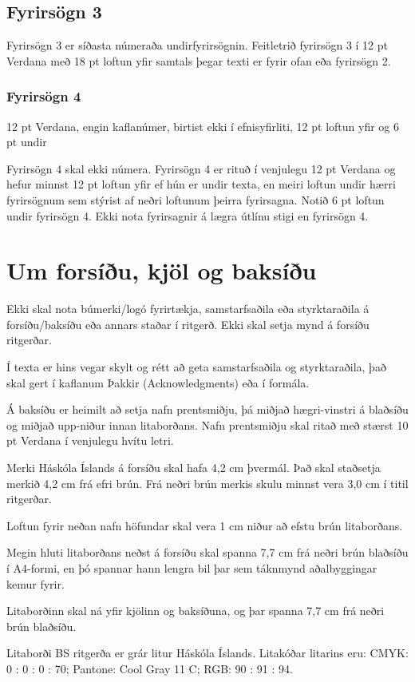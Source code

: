 \documentclass[a4paper, 12pt, twoside]{scrreprt}
\begin{document}
\subsection{Fyrirsögn 3}
Fyrirsögn 3 er síðasta númeraða undirfyrirsögnin. Feitletrið fyrirsögn 3 í 12 pt Verdana með 18 pt loftun yfir samtals þegar texti er fyrir ofan eða fyrirsögn 2. 
\subsubsection{Fyrirsögn 4}
12 pt Verdana, engin kaflanúmer, birtist ekki í efnisyfirliti, 12 pt loftun yfir og 6 pt undir

Fyrirsögn 4 skal ekki númera. Fyrirsögn 4 er rituð í venjulegu 12 pt Verdana og hefur minnst 12 pt loftun yfir ef hún er undir texta, en meiri loftun undir hærri fyrirsögnum sem stýrist af neðri loftunum þeirra fyrirsagna. Notið 6 pt loftun undir fyrirsögn 4.
Ekki nota fyrirsagnir á lægra útlínu stigi en fyrirsögn 4.

\section{Um forsíðu, kjöl og baksíðu}
Ekki skal nota búmerki/logó fyrirtækja, samstarfsaðila eða styrktaraðila á forsíðu/baksíðu eða annars staðar í ritgerð. Ekki skal setja mynd á forsíðu ritgerðar. 

Í texta er hins vegar skylt og rétt að geta samstarfsaðila og styrktaraðila, það skal gert í kaflanum Þakkir (Acknowledgments) eða í formála.

Á baksíðu er heimilt að setja nafn prentsmiðju, þá miðjað hægri-vinstri á blaðsíðu og miðjað upp-niður innan litaborðans. Nafn prentsmiðju skal ritað með stærst 10 pt Verdana í venjulegu hvítu letri.

Merki Háskóla Íslands á forsíðu skal hafa 4,2 cm þvermál. Það skal staðsetja merkið 4,2 cm frá efri brún. Frá neðri brún merkis skulu minnst vera 3,0 cm í titil ritgerðar.

Loftun fyrir neðan nafn höfundar skal vera 1 cm niður að efstu brún litaborðans.

Megin hluti litaborðans neðst á forsíðu skal spanna 7,7 cm frá neðri brún blaðsíðu í A4-formi, en þó spannar hann lengra bil þar sem táknmynd aðalbyggingar kemur fyrir.

Litaborðinn skal ná yfir kjölinn og baksíðuna, og þar spanna 7,7 cm frá neðri brún blaðsíðu.

Litaborði BS ritgerða er grár litur Háskóla Íslands. Litakóðar litarins eru: CMYK: 0 : 0 : 0 : 70; Pantone: Cool Gray 11 C; RGB: 90 : 91 : 94.
\end{document}
